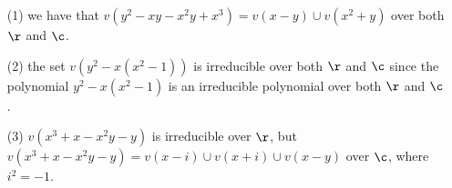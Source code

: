 \begin{example}\label{example_1.14}
    \begin{enumerate}
        \item[(1)] we have that $v(y^2-xy-x^2y+x^3)=v(x-y) \cup v(x^2+y)$ over
            both $\r$ and $\c$.

        \item[(2)] the set $v(y^2-x(x^2-1))$ is irreducible over both $\r$ and
            $\c$ since the polynomial  $y^2-x(x^2-1)$ is an irreducible
            polynomial over both $\r$ and  $\c$.

        \item[(3)] $v(x^3+x-x^2y-y)$ is irreducible over $\r$, but
            $v(x^3+x-x^2y-y)=v(x-i) \cup v(x+i) \cup v(x-y)$ over $\c$, where
            $i^2=-1$.
    \end{enumerate}
\end{example}
